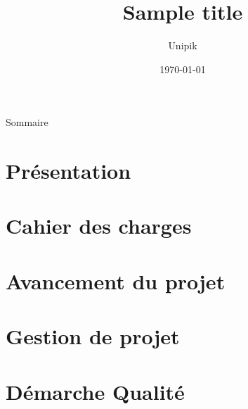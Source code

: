 \documentclass[compress,xcolor=dvipsnames]{beamer}
\title{Sample title}
\date{\today}
\author{Unipik}
\institute{\insa}
\begin{document}
\speaker{\Sergi} 

\begin{frame}[plain]
	\titlepage
\end{frame}

\begin{frame}{Sommaire}
	\tableofcontents[hideallsubsections]
\end{frame}
 

\speaker{\Sergi}
\section[Presentation]{Présentation}


\speaker{\Sergi}
\section[Cahier des charges]{Cahier des charges}


\speaker{\Sergi}
\section[Avancement]{Avancement du projet}


\speaker{\Sergi}
\section[Gestion projet]{Gestion de projet}



\speaker{\Sergi}
\section[Qualité]{Démarche Qualité}


 
\end{document}
